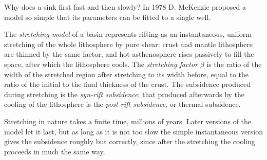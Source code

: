 Why does a  sink first fast and then slowly? In 1978 D. McKenzie proposed a model so
simple that its parameters can be fitted to a single well.

\begin{definition}\label{def:b2:basins-compared:stretching}
The \emph{stretching model} of a basin represents rifting as an
instantaneous, uniform stretching of the whole lithosphere by pure shear: crust and mantle
lithosphere are thinned by the same factor, and hot asthenosphere rises passively to fill the
space, after which the lithosphere cools. The \emph{stretching factor}
$\beta$ is the ratio of the width of the stretched region after stretching to its width before,
equal to the ratio of the initial to the final thickness of the crust. The subsidence produced
during stretching is the \emph{syn-rift subsidence}; that produced
afterwards by the cooling of the lithosphere is the \emph{post-rift
subsidence}, or thermal subsidence.
\end{definition}

Stretching in nature takes a finite time, millions of years. Later versions of the model let it
last, but as long as it is not too slow the simple instantaneous version gives the subsidence
roughly but correctly, since after the stretching the cooling proceeds in much the same way.

